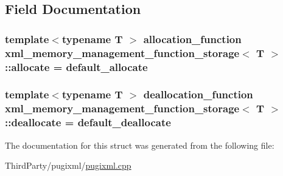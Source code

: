 \subsection{Field Documentation}
\hypertarget{structxml__memory__management__function__storage_abb6865f8d07d27fd9273737c59f6e941}{
\subsubsection[{allocate}]{\setlength{\rightskip}{0pt plus 5cm}template$<$typename T $>$ allocation\-\_\-function {\bf xml\-\_\-memory\-\_\-management\-\_\-function\-\_\-storage}$<$ T $>$\-::allocate = {\bf default\-\_\-allocate}\hspace{0.3cm}{\ttfamily [static]}}}\label{structxml__memory__management__function__storage_abb6865f8d07d27fd9273737c59f6e941}
\hypertarget{structxml__memory__management__function__storage_a1c80a9a045ed6cfb90b17a178e4b3512}{
\subsubsection[{deallocate}]{\setlength{\rightskip}{0pt plus 5cm}template$<$typename T $>$ deallocation\-\_\-function {\bf xml\-\_\-memory\-\_\-management\-\_\-function\-\_\-storage}$<$ T $>$\-::deallocate = {\bf default\-\_\-deallocate}\hspace{0.3cm}{\ttfamily [static]}}}\label{structxml__memory__management__function__storage_a1c80a9a045ed6cfb90b17a178e4b3512}


The documentation for this struct was generated from the following file\-:\begin{DoxyCompactItemize}
\item 
Third\-Party/pugixml/\hyperlink{pugixml_8cpp}{pugixml.\-cpp}\end{DoxyCompactItemize}
